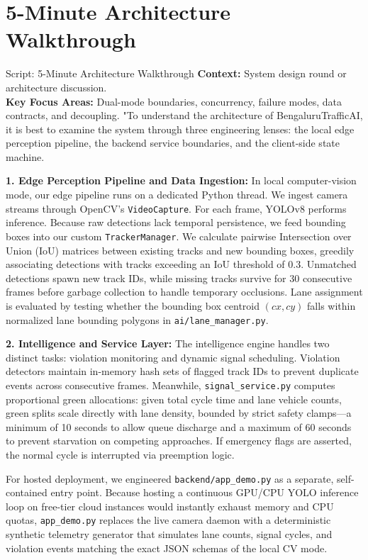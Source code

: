 \documentclass[11pt,a4paper,oneside]{report}
\begin{document}
\section{5-Minute Architecture Walkthrough}
\label{sec:script_5min}

\begin{interviewq}{Script: 5-Minute Architecture Walkthrough}
\textbf{Context:} System design round or architecture discussion.\\
\textbf{Key Focus Areas:} Dual-mode boundaries, concurrency, failure modes, data contracts, and decoupling.
\tcblower
"To understand the architecture of BengaluruTrafficAI, it is best to examine the system through three engineering lenses: the local edge perception pipeline, the backend service boundaries, and the client-side state machine.

\textbf{1. Edge Perception Pipeline and Data Ingestion:}
In local computer-vision mode, our edge pipeline runs on a dedicated Python thread. We ingest camera streams through OpenCV's \texttt{VideoCapture}. For each frame, YOLOv8 performs inference. Because raw detections lack temporal persistence, we feed bounding boxes into our custom \texttt{TrackerManager}. We calculate pairwise Intersection over Union (IoU) matrices between existing tracks and new bounding boxes, greedily associating detections with tracks exceeding an IoU threshold of 0.3. Unmatched detections spawn new track IDs, while missing tracks survive for 30 consecutive frames before garbage collection to handle temporary occlusions. Lane assignment is evaluated by testing whether the bounding box centroid $(cx, cy)$ falls within normalized lane bounding polygons in \texttt{ai/lane\_manager.py}.

\textbf{2. Intelligence and Service Layer:}
The intelligence engine handles two distinct tasks: violation monitoring and dynamic signal scheduling. Violation detectors maintain in-memory hash sets of flagged track IDs to prevent duplicate events across consecutive frames. Meanwhile, \texttt{signal\_service.py} computes proportional green allocations: given total cycle time and lane vehicle counts, green splits scale directly with lane density, bounded by strict safety clamps---a minimum of 10 seconds to allow queue discharge and a maximum of 60 seconds to prevent starvation on competing approaches. If emergency flags are asserted, the normal cycle is interrupted via preemption logic.

For hosted deployment, we engineered \texttt{backend/app\_demo.py} as a separate, self-contained entry point. Because hosting a continuous GPU/CPU YOLO inference loop on free-tier cloud instances would instantly exhaust memory and CPU quotas, \texttt{app\_demo.py} replaces the live camera daemon with a deterministic synthetic telemetry generator that simulates lane counts, signal cycles, and violation events matching the exact JSON schemas of the local CV mode.


\end{interviewq}
\end{document}

